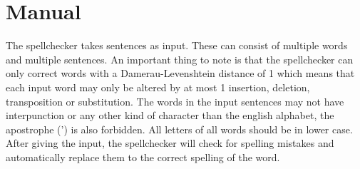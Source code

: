 \documentclass[a4paper,twoside,11pt]{article}
\begin{document}
\section{Manual}
The spellchecker takes sentences as input. These can consist of multiple words and multiple sentences. An important thing to note is that the spellchecker can only correct words with a Damerau-Levenshtein distance of 1 which means that each input word may only be altered by at most 1 insertion, deletion, transposition or substitution. The words in the input sentences may not have interpunction or any other kind of character than the english alphabet, the apostrophe (') is also forbidden. All letters of all words should be in lower case. After giving the input, the spellchecker will check for spelling mistakes and automatically replace them to the correct spelling of the word.
\end{document}
